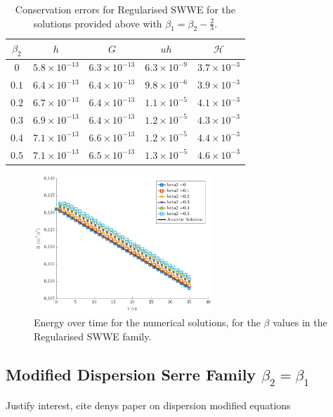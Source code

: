 \documentclass[10pt]{elsarticle}
\newcommand\T{\rule{0pt}{3ex }}       %
\begin{document}
\begin{table}
	\centering
	\begin{tabular}{ c | c | c | c | c }
	$\beta_2$ & $h$ & $G$ & $uh$ & $\mathcal{H}$  \\
		\hline
	\T $0$ &	$5.8 \times 10^{-13}$ & $6.3 \times 10^{-13}$  & $6.3 \times 10^{-9}$ &	 $3.7 \times 10^{-3}$ \\
	\T $0.1$ &	$6.4 \times 10^{-13}$ & $6.4 \times 10^{-13}$  & $9.8 \times 10^{-6}$ &	 $3.9 \times 10^{-3}$ \\
	\T $0.2$ &	$6.7 \times 10^{-13}$ & $6.4 \times 10^{-13}$  & $1.1\times 10^{-5}$ &	 $4.1 \times 10^{-3}$ \\
	\T $0.3$ &	$6.9 \times 10^{-13}$ & $6.4 \times 10^{-13}$  & $1.2\times 10^{-5}$ &	 $4.3 \times 10^{-3}$ \\
	\T $0.4$ &	$7.1 \times 10^{-13}$ & $6.6 \times 10^{-13}$  & $1.2\times 10^{-5}$ &	 $4.4 \times 10^{-3}$ \\
	\T $0.5$ &	$7.1 \times 10^{-13}$ & $6.5 \times 10^{-13}$  & $1.3\times 10^{-5}$ &	 $4.6 \times 10^{-3}$ \\
	\end{tabular}
	\caption{Conservation errors for Regularised SWWE for the solutions provided above with $\beta_1 = \beta_2 - \frac{2}{3}$.}
\end{table}


\begin{figure}
	\centering
	\includegraphics[width=0.6\textwidth]{./Figures/Simulations/Study/RegSWWE/Energy/EnergyOverTime.pdf}
	\caption{Energy over time for the numerical solutions, for the $\beta$ values in the Regularised SWWE family.}
\end{figure}


\subsection{Modified Dispersion Serre Family $\beta_2 = \beta_1$}
Justify interest, cite denys paper on dispersion modified equations
\end{document}
